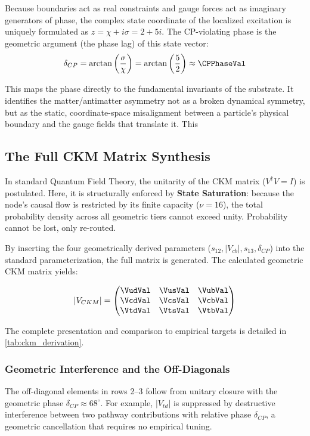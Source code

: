 Because boundaries act as real constraints and gauge forces act as imaginary generators of phase, the complex state coordinate of the localized excitation is uniquely formulated as $z = \chi + i\sigma = 2 + 5i$. The CP-violating phase is the geometric argument (the phase lag) of this state vector:
\begin{equation}
    \delta_{CP} = \arctan\left(\frac{\sigma}{\chi}\right) = \arctan\left(\frac{5}{2}\right) \approx \CPPhaseVal
\end{equation}

This maps the phase directly to the fundamental invariants of the substrate. It identifies the matter/antimatter asymmetry not as a broken dynamical symmetry, but as the static, coordinate-space misalignment between a particle's physical boundary and the gauge fields that translate it. This \CPPhaseAccText

\subsection{The Full CKM Matrix Synthesis}

In standard Quantum Field Theory, the unitarity of the CKM matrix ($V^\dagger V = I$) is postulated. Here, it is structurally enforced by \textbf{State Saturation}: because the node's causal flow is restricted by its finite capacity ($\nu=16$), the total probability density across all geometric tiers cannot exceed unity. Probability cannot be lost, only re-routed.

By inserting the four geometrically derived parameters ($s_{12}, |V_{cb}|, s_{13}, \delta_{CP}$) into the standard parameterization, the full matrix is generated. The calculated geometric CKM matrix yields:

\begin{equation}
|V_{CKM}| =
\begin{pmatrix}
\VudVal & \VusVal & \VubVal \\
\VcdVal & \VcsVal & \VcbVal \\
\VtdVal & \VtsVal & \VtbVal
\end{pmatrix}
\end{equation}

The complete presentation and comparison to empirical targets is detailed in \cref{tab:ckm_derivation}.



\subsubsection{Geometric Interference and the Off-Diagonals}
The off-diagonal elements in rows 2--3 follow from unitary closure with the geometric phase $\delta_{CP} \approx 68^\circ$. For example, $|V_{td}|$ is suppressed by destructive interference between two pathway contributions with relative phase $\delta_{CP}$, a geometric cancellation that requires no empirical tuning.

